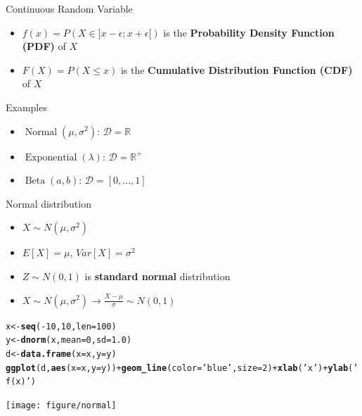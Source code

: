 \documentclass{beamer}\usepackage[]{graphicx}\usepackage[]{color}
\makeatletter
\newcommand{\hlnum}[1]{\textcolor[rgb]{0.686,0.059,0.569}{#1}}%
\newcommand{\hlstr}[1]{\textcolor[rgb]{0.192,0.494,0.8}{#1}}%
\newcommand{\hlopt}[1]{\textcolor[rgb]{0,0,0}{#1}}%
\newcommand{\hlstd}[1]{\textcolor[rgb]{0.345,0.345,0.345}{#1}}%
\newcommand{\hlkwb}[1]{\textcolor[rgb]{0.69,0.353,0.396}{#1}}%
\newcommand{\hlkwc}[1]{\textcolor[rgb]{0.333,0.667,0.333}{#1}}%
\newcommand{\hlkwd}[1]{\textcolor[rgb]{0.737,0.353,0.396}{\textbf{#1}}}%
\newenvironment{kframe}{%
 \def\at@end@of@kframe{}%
 \ifinner\ifhmode%
  \def\at@end@of@kframe{\end{minipage}}%
  \begin{minipage}{\columnwidth}%
 \fi\fi%
 \def\FrameCommand##1{\hskip\@totalleftmargin \hskip-\fboxsep
 \colorbox{shadecolor}{##1}\hskip-\fboxsep
     \hskip-\linewidth \hskip-\@totalleftmargin \hskip\columnwidth}%
 \MakeFramed {\advance\hsize-\width
   \@totalleftmargin\z@ \linewidth\hsize
   \@setminipage}}%
 {\par\unskip\endMakeFramed%
 \at@end@of@kframe}
\newenvironment{knitrout}{}{} %
\makeatother
\begin{document}
\begin{frame}{Continuous Random Variable}
  \begin{itemize}
    \item $f(x) = P(X \in ]x-\epsilon;x+\epsilon[)$ is the \textbf{Probability Density Function (PDF)} of $X$
    \item $F(X) = P(X\le x)$ is the \textbf{Cumulative Distribution Function (CDF)} of $X$
  \end{itemize}
  \begin{exampleblock}{Examples}
    \begin{itemize}
      \item $\operatorname{Normal}(\mu, \sigma^2)$: $\mathcal{D} = \mathbb{R}$ 
      \item $\operatorname{Exponential}(\lambda)$: $\mathcal{D} = \mathbb{R}^+$
      \item $\operatorname{Beta}(a, b)$: $\mathcal{D} = [0, \dots, 1]$
    \end{itemize}
  \end{exampleblock}
\end{frame}

\begin{frame}[fragile]{Normal distribution}
  \begin{itemize}
    \item $X \sim N(\mu, \sigma^2)$
    \item $E[X]=\mu$, $Var[X]=\sigma^2$
    \item $Z \sim N(0, 1)$ is \textbf{standard normal} distribution
    \item $X \sim N(\mu, \sigma^2) \rightarrow \frac{X-\mu}{\sigma} \sim N(0,1)$
  \end{itemize}
\begin{knitrout}\tiny
{}\color{fgcolor}\begin{kframe}
\begin{alltt}
\hlstd{x} \hlkwb{<-} \hlkwd{seq}\hlstd{(}\hlopt{-}\hlnum{10}\hlstd{,} \hlnum{10}\hlstd{,} \hlkwc{len}\hlstd{=}\hlnum{100}\hlstd{)}
\hlstd{y} \hlkwb{<-} \hlkwd{dnorm}\hlstd{(x,} \hlkwc{mean}\hlstd{=}\hlnum{0}\hlstd{,} \hlkwc{sd}\hlstd{=}\hlnum{1.0}\hlstd{)}
\hlstd{d} \hlkwb{<-} \hlkwd{data.frame}\hlstd{(}\hlkwc{x}\hlstd{=x,} \hlkwc{y}\hlstd{=y)}
\hlkwd{ggplot}\hlstd{(d,} \hlkwd{aes}\hlstd{(}\hlkwc{x}\hlstd{=x,} \hlkwc{y}\hlstd{=y))} \hlopt{+} \hlkwd{geom_line}\hlstd{(}\hlkwc{color}\hlstd{=}\hlstr{'blue'}\hlstd{,} \hlkwc{size}\hlstd{=}\hlnum{2}\hlstd{)} \hlopt{+} \hlkwd{xlab}\hlstd{(}\hlstr{'x'}\hlstd{)} \hlopt{+} \hlkwd{ylab}\hlstd{(}\hlstr{'f(x)'}\hlstd{)}
\end{alltt}
\end{kframe}

{\centering \texttt{[image: figure/normal]} 

}



\end{knitrout}
\end{frame}
\end{document}
